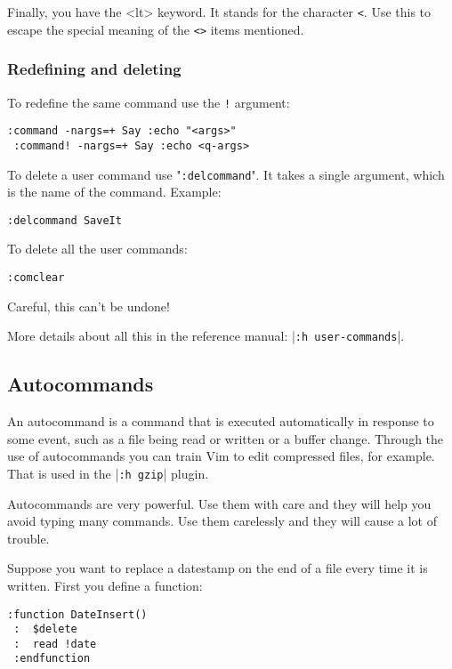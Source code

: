 {Finally, you have the <lt> keyword.
It stands for the character \verb!<!.
Use this to escape the special meaning of the \verb!<>! items mentioned.

\subsubsection{Redefining and deleting}
To redefine the same command use the \verb:!: argument:

\begin{Verbatim}[samepage=true]
 :command -nargs=+ Say :echo "<args>"
 :command! -nargs=+ Say :echo <q-args>
\end{Verbatim}

To delete a user command use "\verb!:delcommand!".
It takes a single argument, which is the name of the command.
Example:

\begin{Verbatim}[samepage=true]
 :delcommand SaveIt
\end{Verbatim}

To delete all the user commands:

\begin{Verbatim}[samepage=true]
 :comclear
\end{Verbatim}

Careful, this can't be undone!

More details about all this in the reference manual: |\verb!:h user-commands!|.
\subsection{Autocommands}
\label{Autocommands}
An autocommand is a command that is executed automatically in response to some event, such as a file being read or written or a buffer change.
Through the use of autocommands you can train Vim to edit compressed files, for example.
That is used in the |\verb!:h gzip!| plugin.

Autocommands are very powerful.
Use them with care and they will help you avoid typing many commands.
Use them carelessly and they will cause a lot of trouble.

Suppose you want to replace a datestamp on the end of a file every time it is written.
First you define a function:

\begin{Verbatim}[samepage=true]
 :function DateInsert()
 :  $delete
 :  read !date
 :endfunction
\end{Verbatim}

}
